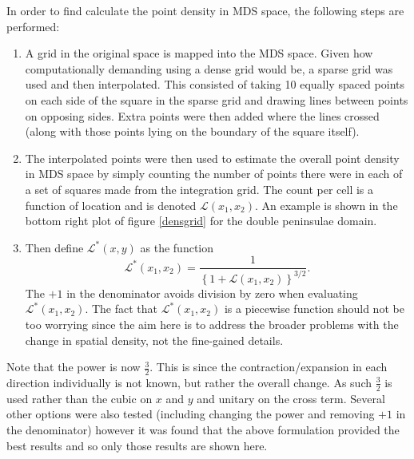 In order to find calculate the point density in MDS space, the following steps are performed:
\begin{enumerate}
\item A grid in the original space is mapped into the MDS space. Given how computationally demanding using a dense grid would be, a sparse grid was used and then interpolated. This consisted of taking 10 equally spaced points on each side of the square in the sparse grid and drawing lines between points on opposing sides. Extra points were then added where the lines crossed (along with those points lying on the boundary of the square itself).
\item The interpolated points were then used to estimate the overall point density in MDS space by simply counting the number of points there were in each of a set of squares made from the integration grid. The count per cell is a function of location and is denoted $\mathcal{L}(x_1,x_2)$. An example is shown in the bottom right plot of figure \ref{densgrid} for the double peninsulae domain. 
\item Then define $\mathcal{L}^*(x,y)$ as the function
\begin{equation*}
\mathcal{L}^*(x_1,x_2)=\frac{1}{ \left \{ 1+\mathcal{L}(x_1,x_2) \right \}^{3/2}}.
\end{equation*}
The $+1$ in the denominator avoids division by zero when evaluating $\mathcal{L}^*(x_1,x_2)$. The fact that $\mathcal{L}^*(x_1,x_2)$ is a piecewise function should not be too worrying since the aim here is to address the broader problems with the change in spatial density, not the fine-gained details.
\end{enumerate}

Note that the power is now $\frac{3}{2}$. This is since the contraction/expansion in each direction individually is not known, but rather the overall change. As such $\frac{3}{2}$ is used rather than the cubic on $x$ and $y$ and unitary on the cross term. Several other options were also tested (including changing the power and removing $+1$ in the denominator) however it was found that the above formulation provided the best results and so only those results are shown here.

